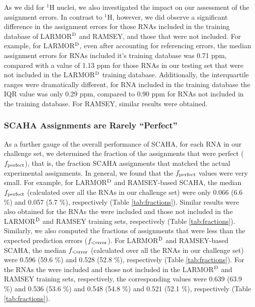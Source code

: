 \documentclass[journal=jcisd8,manuscript=article,layout=onecolumn]{achemso}
\begin{document}
As we did for $^{1}$H nuclei, we also investigated the impact on our assessment of the assignment errors. In contrast to $^{1}$H, however, we did observe a significant difference in the assignment errors for those RNAs included in the training database of LARMOR$^{\rm D}$ and RAMSEY, and those that were not included. For example, for LARMOR$^{\rm D}$, even after accounting for referencing errors, the median assignment errors for RNAs included it's training database was 0.71 ppm, compared with a value of 1.13 ppm for those RNAs in our testing set that were not included in the LARMOR$^{\rm D}$ training database.  Additionally, the interquartile ranges were dramatically different, for RNA included in the training database the IQR value was only 0.29 ppm, compared to 0.90 ppm for RNAs not included in the training database. For RAMSEY, similar results were obtained.

\subsubsection{SCAHA Assignments are Rarely ``Perfect''} 
As a further gauge of the overall performance of SCAHA, for each RNA in our challenge set, we determined the fraction of the assignments that were perfect ($f_{\rm perfect}$), that is, the fraction SCAHA assignments that matched the actual experimental assignments. In general, we found that the $f_{\rm perfect}$ values were very small.  For example, for LARMOR$^{\rm D}$ and RAMSEY-based SCAHA, the median $f_{\rm perfect}$ (calculated over all the RNAs in our challenge set) were only 0.066 (6.6 \%) and 0.057 (5.7 \%), respectively  (Table \ref{tab:fractions}). Similar results were also obtained for the RNAs the were included and those not included in the LARMOR$^{\rm D}$ and RAMSEY training sets, respectively (Table \ref{tab:fractions}). Similarly, we also computed the fractions of assignments that were less than the expected prediction errors ($f_{\rm < error}$). For LARMOR$^{\rm D}$ and RAMSEY-based SCAHA, the median $f_{\rm < error}$ (calculated over all the RNAs in our challenge set) were 0.596 (59.6 \%) and 0.528 (52.8 \%), respectively  (Table \ref{tab:fractions}). For the RNAs the were included and those not included in the LARMOR$^{\rm D}$ and RAMSEY training sets, respectively, the corresponding values were 0.639 (63.9 \%) and 0.536 (53.6 \%) and 0.548 (54.8 \%) and 0.521 (52.1 \%), respectively (Table \ref{tab:fractions}). 
\end{document}

